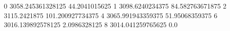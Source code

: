 0 3058.245361328125 44.2041015625
1 3098.6240234375 84.582763671875
2 3115.2421875 101.200927734375
4 3065.991943359375 51.95068359375
6 3016.139892578125 2.0986328125
8 3014.041259765625 0.0

